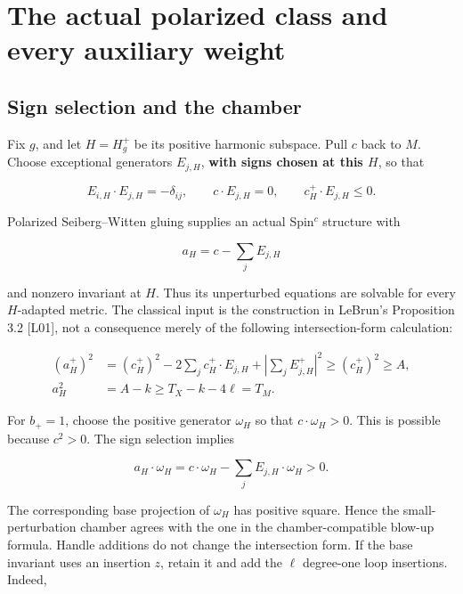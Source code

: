 \documentclass[
  11pt,
]{article}
\begin{document}
\hypertarget{the-actual-polarized-class-and-every-auxiliary-weight}{%
\section{The actual polarized class and every auxiliary
weight}\label{the-actual-polarized-class-and-every-auxiliary-weight}}

\hypertarget{sign-selection-and-the-chamber}{%
\subsection{Sign selection and the
chamber}\label{sign-selection-and-the-chamber}}

Fix \(g\), and let \(H=H_g^+\) be its positive harmonic subspace. Pull
\(c\) back to \(M\). Choose exceptional generators \(E_{j,H}\),
\textbf{with signs chosen at this \(H\)}, so that

\[
E_{i,H}\cdot E_{j,H}=-\delta_{ij},\qquad
c\cdot E_{j,H}=0,\qquad c_H^+\cdot E_{j,H}\le0.
\]

Polarized Seiberg--Witten gluing supplies an actual Spin\(^c\) structure
with

\[
a_H=c-\sum_j E_{j,H}                                  \tag{3}
\]

and nonzero invariant at \(H\). Thus its unperturbed equations are
solvable for every \(H\)-adapted metric. The classical input is the
construction in LeBrun's Proposition 3.2 {[}L01{]}, not a consequence
merely of the following intersection-form calculation:

\[
\begin{split}
(a_H^+)^2
 &=(c_H^+)^2-2\sum_j c_H^+\cdot E_{j,H}
                  +\left|\sum_j E_{j,H}^+\right|^2
 \ge(c_H^+)^2\ge A,\\
a_H^2&=A-k\ge T_X-k-4\ell=T_M.
\end{split}                                           \tag{4}
\]

For \(b_+=1\), choose the positive generator \(\omega_H\) so that
\(c\cdot\omega_H>0\). This is possible because \(c^2>0\). The sign
selection implies

\[
a_H\cdot\omega_H=c\cdot\omega_H-\sum_j E_{j,H}\cdot\omega_H>0.
\]

The corresponding base projection of \(\omega_H\) has positive square.
Hence the small-perturbation chamber agrees with the one in the
chamber-compatible blow-up formula. Handle additions do not change the
intersection form. If the base invariant uses an insertion \(z\), retain
it and add the \(\ell\) degree-one loop insertions. Indeed,
\end{document}
